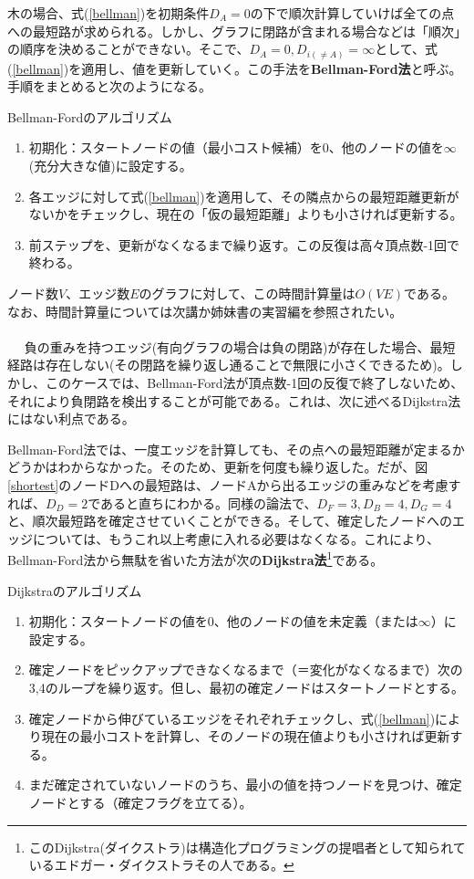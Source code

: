 木の場合、式(\ref{bellman})を初期条件$D_A=0$の下で順次計算していけば全ての点への最短路が求められる。しかし、グラフに閉路が含まれる場合などは「順次」の順序を決めることができない。そこで、$D_A=0,D_{i(\neq A)}=\infty$として、式(\ref{bellman})を適用し、値を更新していく。この手法を\textbf{Bellman-Ford法}と呼ぶ。手順をまとめると次のようになる。
\begin{itembox}[l]{Bellman-Fordのアルゴリズム}
\begin{enumerate}
\item 初期化：スタートノードの値（最小コスト候補）を0、他のノードの値を$\infty$(充分大きな値)に設定する。
\item 各エッジに対して式(\ref{bellman})を適用して、その隣点からの最短距離更新がないかをチェックし、現在の「仮の最短距離」よりも小さければ更新する。
\item 前ステップを、更新がなくなるまで繰り返す。この反復は高々頂点数-1回で終わる。
\end{enumerate}
\end{itembox}

ノード数$V$、エッジ数$E$のグラフに対して、この時間計算量は$O(VE)$である。なお、時間計算量については次講か姉妹書の実習編を参照されたい。
\\ \\　
負の重みを持つエッジ(有向グラフの場合は負の閉路)が存在した場合、最短経路は存在しない(その閉路を繰り返し通ることで無限に小さくできるため)。しかし、このケースでは、Bellman-Ford法が頂点数-1回の反復で終了しないため、それにより負閉路を検出することが可能である。これは、次に述べるDijkstra法にはない利点である。

Bellman-Ford法では、一度エッジを計算しても、その点への最短距離が定まるかどうかはわからなかった。そのため、更新を何度も繰り返した。だが、図\ref{shortest}のノードDへの最短路は、ノードAから出るエッジの重みなどを考慮すれば、$D_D=2$であると直ちにわかる。同様の論法で、$D_F=3,D_B=4,D_G=4$と、順次最短路を確定させていくことができる。そして、確定したノードへのエッジについては、もうこれ以上考慮に入れる必要はなくなる。これにより、Bellman-Ford法から無駄を省いた方法が次の\textbf{Dijkstra法}\footnote{このDijkstra(ダイクストラ)は構造化プログラミングの提唱者として知られているエドガー・ダイクストラその人である。}である。
\begin{itembox}[l]{Dijkstraのアルゴリズム}
\begin{enumerate}
\item 初期化：スタートノードの値を0、他のノードの値を未定義（または$\infty$）に設定する。
\item 確定ノードをピックアップできなくなるまで（＝変化がなくなるまで）次の3,4のループを繰り返す。但し、最初の確定ノードはスタートノードとする。
\item 確定ノードから伸びているエッジをそれぞれチェックし、式(\ref{bellman})により現在の最小コストを計算し、そのノードの現在値よりも小さければ更新する。
\item まだ確定されていないノードのうち、最小の値を持つノードを見つけ、確定ノードとする（確定フラグを立てる）。
\end{enumerate}
\end{itembox}

